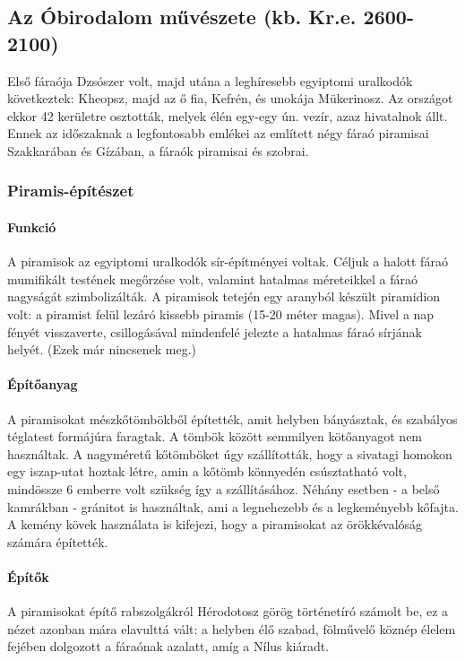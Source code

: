\clearpage

\subsection*{Az Óbirodalom művészete (kb. Kr.e. 2600-2100)}

Első fáraója Dzsószer volt, majd utána a leghíresebb egyiptomi uralkodók következtek: Kheopsz, majd az ő fia, Kefrén, és unokája Mükerinosz. Az országot ekkor 42 kerületre osztották, melyek élén egy-egy ún. vezír, azaz hivatalnok állt. Ennek az időszaknak a legfontosabb emlékei az említett négy fáraó piramisai Szakkarában és Gízában, a fáraók piramisai és szobrai.

\subsubsection*{Piramis-építészet}

\paragraph{Funkció} A piramisok az egyiptomi uralkodók sír-építményei voltak. Céljuk a halott fáraó mumifikált testének megőrzése volt, valamint hatalmas méreteikkel a fáraó nagyságát szimbolizálták. A piramisok tetején egy aranyból készült piramidion volt: a piramist felül lezáró kissebb piramis (15-20 méter magas). Mivel a nap fényét visszaverte, csillogásával mindenfelé jelezte a hatalmas fáraó sírjának helyét. (Ezek már nincsenek meg.)

\paragraph{Építőanyag} A piramisokat mészkőtömbökből építették, amit helyben bányásztak, és szabályos téglatest formájúra faragtak. A tömbök között semmilyen kötőanyagot nem használtak. A nagyméretű kőtömböket úgy szállították, hogy a sivatagi homokon egy iszap-utat hoztak létre, amin a kőtömb könnyedén csúsztatható volt, mindössze 6 emberre volt szükség így a szállításához. Néhány esetben - a belső kamrákban - gránitot is használtak, ami a legnehezebb és a legkeményebb kőfajta. A kemény kövek használata is kifejezi, hogy a piramisokat az örökkévalóság számára építették.

\paragraph{Építők} A piramisokat építő rabszolgákról Hérodotosz görög történetíró számolt be, ez a nézet azonban mára elavulttá vált: a helyben élő szabad, fölművelő köznép élelem fejében dolgozott a fáraónak azalatt, amíg a Nílus kiáradt. 

